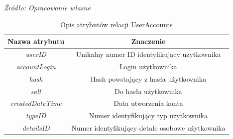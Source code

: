 \documentclass[12pt,oneside]{report}
\begin{document}
\begin{enumerate}[start=10,label={\bfseries REL\textbackslash\arabic*}]
	\begin{table}[H]
		\caption{Opis atrybutów relacji UserAccounts}
		\textit{Źródło: Opracowanie własne}
		\label{UserAccountsAttributeDescription}
		\centering
		\begin{tabular}{|c|c|}
			\hline
			Nazwa atrybutu & Znaczenie \\
			\hline
			\textit{userID}&Unikalny numer ID identyfikujący użytkownika \\	
			\hline
			\textit{accountLogin}&Login użytkownika\\	
			\hline			
			\textit{hash}&Hash powstający z hasła użytkownika\\	
			\hline			
			\textit{salt}& Do hasła użytkownika\\	
			\hline			
			\textit{createdDateTime}& Data utworzenia konta\\	
			\hline			
			\textit{typeID}&Numer identyfikujący typ użytkownika\\	
			\hline			
			\textit{detailsID}&Numer identyfikujący detale osobowe użytkownika\\	
			\hline
		\end{tabular}
	\end{table}
	

\end{enumerate}
\end{document}
